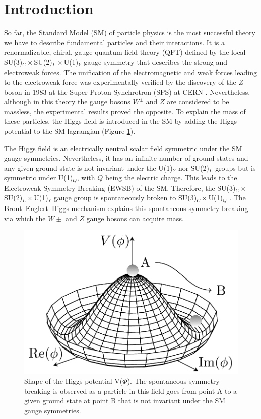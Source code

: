 \section{Introduction} \label{intro}

So far, the Standard Model (SM) of particle physics is the most successful theory we have to describe fundamental particles and their interactions. It is a renormalizable, chiral, gauge quantum field theory (QFT) defined by the local SU(3)$_C \times$SU(2)$_L\times$U(1)$_Y$ gauge symmetry that describes the strong and electroweak forces.  The unification of the electromagnetic and weak forces leading to the electroweak force was experimentally verified by the discovery of the $Z$ boson in 1983 at the Super Proton Synchrotron (SPS) at CERN \cite{Zboson}. Nevertheless, although in this theory the gauge bosons $W^\pm$ and $Z$ are considered to be massless, the experimental results proved the opposite. To explain the mass of these particles, the Higgs field is introduced in the SM by adding the Higgs potential to the SM lagrangian (Figure \ref{fig: Higgs portential}).

The Higgs field is an electrically neutral scalar field symmetric under the SM gauge symmetries. Nevertheless, it has an infinite number of ground states and any given ground state is not invariant under the U(1)$_Y$ nor SU(2)$_L$ groups but is symmetric under U(1)$_Q$, with $Q$ being the electric charge. This leads to the Electroweak Symmetry Breaking (EWSB) of the SM. Therefore, the SU(3)$_C \times$SU(2)$_L\times$U(1)$_Y$ gauge group is spontaneously broken to SU(3)$_C \times$U(1)$_Q$ \cite{EWSB}. The Brout–Englert–Higgs mechanism explains this spontaneous symmetry breaking via which the $W\pm$ and $Z$ gauge bosons can acquire mass. \cite{Higgs64}

\begin{figure}[hbt]
    \centering
    \includegraphics[width=0.4\linewidth]{Images/1.Intro/higgs-potential.png}
    \caption{Shape of the Higgs potential V($\Phi$). The spontaneous symmetry breaking is observed as a particle in this field goes from point A to a given ground state at point B that is not invariant under the SM gauge symmetries. \cite{HiggsPotdrawing}}
    \label{fig: Higgs portential}
\end{figure}


